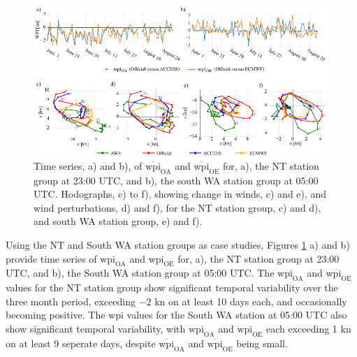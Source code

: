 \documentclass[alpha-refs]{wiley-article}
\begin{document}
\begin{figure}
\centering
\includegraphics{case_studies.pdf}
\caption{Time series, a) and b), of $\overline{\text{wpi}}_\text{OA}$ and $\overline{\text{wpi}}_\text{OE}$ for, a), the NT station group at 23:00 UTC, and b), the south WA station group at 05:00 UTC. Hodographs, c) to f), showing change in winds, c) and e), and wind perturbations, d) and f), for the NT station group, c) and d), and south WA station group, e) and f).}
\label{Fig:case_studies}
\end{figure}

Using the NT and South WA station groups as case studies, Figures \ref{Fig:case_studies} a) and b) provide time series of $\text{wpi}_\text{OA}$ and $\text{wpi}_\text{OE}$ for, a), the NT station group at 23:00 UTC, and b), the South WA station group at 05:00 UTC. The $\text{wpi}_\text{OA}$ and $\text{wpi}_\text{OE}$ values for the NT station group show significant temporal variability over the three month period, exceeding $-2$ kn on at least 10 days each, and occasionally becoming positive. The $\text{wpi}$ values for the South WA station at 05:00 UTC also show significant temporal variability, with $\text{wpi}_\text{OA}$ and $\text{wpi}_\text{OE}$ each exceeding 1 kn on at least 9 seperate days, despite $\overline{\text{wpi}}_\text{OA}$ and $\overline{\text{wpi}}_\text{OE}$ being small. 
\end{document}

